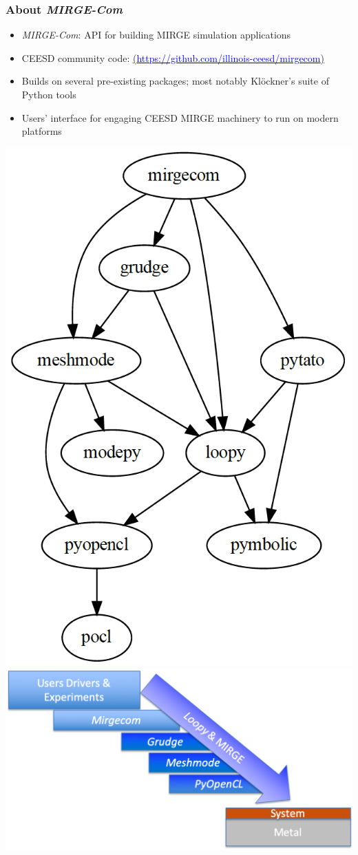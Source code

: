 \begin{frame}\frametitle{About \textit{MIRGE-Com}}
\begin{multicols}{2}
\begin{itemize}
  \item \textit{MIRGE-Com}: API for building MIRGE simulation applications
  \item CEESD community code: \href{https://github.com/illinois-ceesd/mirgecom}{(\textcolor{blue}{https://github.com/illinois-ceesd/mirgecom})}
  \item Builds on several pre-existing packages; most notably Kl{\"o}ckner's suite of Python tools
  \item Users' interface for engaging CEESD MIRGE machinery to run on modern platforms
\end{itemize}
\end{multicols}
\begin{multicols}{2}
\hspace{.6in}
\includegraphics[width=.25\textwidth]{figures/MirgecomPackageTree.png}
\hspace{-.4in}
\vspace{-.2in}
\includegraphics[width=.5\textwidth]{figures/mirgecom_cartoon.png}
\end{multicols}
\end{frame}

